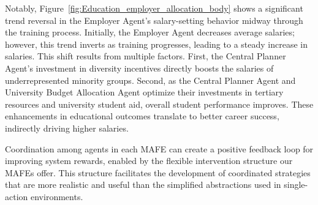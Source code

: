 Notably, Figure~\ref{fig:Education_employer_allocation_body} shows a significant trend reversal in the Employer Agent’s salary-setting behavior midway through the training process. Initially, the Employer Agent decreases average salaries; however, this trend inverts as training progresses, leading to a steady increase in salaries. This shift results from multiple factors. First, the Central Planner Agent’s investment in diversity incentives directly boosts the salaries of underrepresented minority groups. Second, as the Central Planner Agent and University Budget Allocation Agent optimize their investments in tertiary resources and university student aid, overall student performance improves. These enhancements in educational outcomes translate to better career success, indirectly driving higher salaries.

Coordination among agents in each MAFE can create a positive feedback loop for improving system rewards, enabled by the flexible intervention structure our MAFEs offer. This structure facilitates the development of coordinated strategies that are more realistic and useful than the simplified abstractions used in single-action environments.

